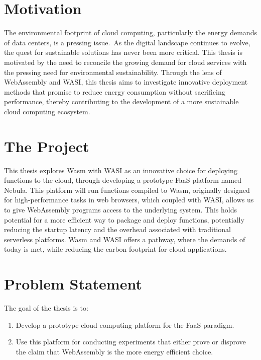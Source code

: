 \documentclass[
  table]{report}
\providecommand{\tightlist}{%
  \setlength{\itemsep}{0pt}\setlength{\parskip}{0pt}}
\begin{document}
\section{Motivation}
\label{sect:motivation}

The environmental footprint of cloud computing, particularly the energy
demands of data centers, is a pressing issue.~As the digital landscape
continues to evolve, the quest for sustainable solutions has never been
more critical. This thesis is motivated by the need to reconcile the
growing demand for cloud services with the pressing need for
environmental sustainability. Through the lens of WebAssembly and
\ac{WASI}, this thesis aims to investigate innovative deployment methods
that promise to reduce energy consumption without sacrificing
performance, thereby contributing to the development of a more
sustainable cloud computing ecosystem.

\section{The Project}
\label{sect:project}

This thesis explores \ac{Wasm} with \ac{WASI} as an innovative choice
for deploying functions to the cloud, through developing a prototype
\ac{FaaS} platform named Nebula. This platform will run functions
compiled to \ac{Wasm}, originally designed for high-performance tasks in
web browsers, which coupled with \ac{WASI}, allows us to give
WebAssembly programs access to the underlying system. This holds
potential for a more efficient way to package and deploy functions,
potentially reducing the startup latency and the overhead associated
with traditional serverless platforms. \ac{Wasm} and \ac{WASI} offers a
pathway, where the demands of today is met, while reducing the carbon
footprint for cloud applications.

\section{Problem Statement}
\label{sect:problems}

The goal of the thesis is to:

\begin{enumerate}
\def\labelenumi{\arabic{enumi}.}
\tightlist
\item
  Develop a prototype cloud computing platform for the \ac{FaaS}
  paradigm.
\item
  Use this platform for conducting experiments that either prove or
  disprove the claim that WebAssembly is the more energy efficient
  choice.
\end{enumerate}
\end{document}
